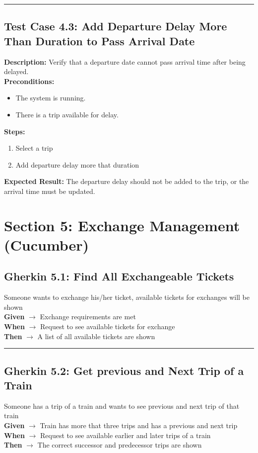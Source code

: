 \documentclass{article}
\begin{document}
\bigskip
\hrule
\bigskip

\subsection{Test Case 4.3: Add Departure Delay More Than Duration to Pass Arrival Date}

\textbf{Description:} Verify that a departure date cannot pass arrival time after being delayed.\\
\textbf{Preconditions:}
\begin{itemize}
  \item The system is running.
  \item There is a trip available for delay.
\end{itemize}
\textbf{Steps:}
\begin{enumerate}
    \item Select a trip
    \item Add departure delay more that duration
\end{enumerate}
\textbf{Expected Result:} The departure delay should not be added to the trip, or the arrival time must be updated.

\pagebreak

\section{Section 5: Exchange Management (Cucumber)}
\bigskip
\bigskip
\subsection{Gherkin 5.1: Find All Exchangeable Tickets}

Someone wants to exchange his/her ticket, available tickets for exchanges will be shown\\
\textbf{Given} $\rightarrow$ Exchange requirements are met \\
\textbf{When} $\rightarrow$ Request to see available tickets for exchange \\
\textbf{Then} $\rightarrow$ A list of all available tickets are shown

\bigskip
\hrule
\bigskip

\subsection{Gherkin 5.2: Get previous and Next Trip of a Train}

Someone has a trip of a train and wants to see previous and next trip of that train\\
\textbf{Given} $\rightarrow$ Train has more that three trips and has a previous and next trip \\
\textbf{When} $\rightarrow$ Request to see available earlier and later trips of a train \\
\textbf{Then} $\rightarrow$ The correct successor and predecessor trips are shown
\end{document}
